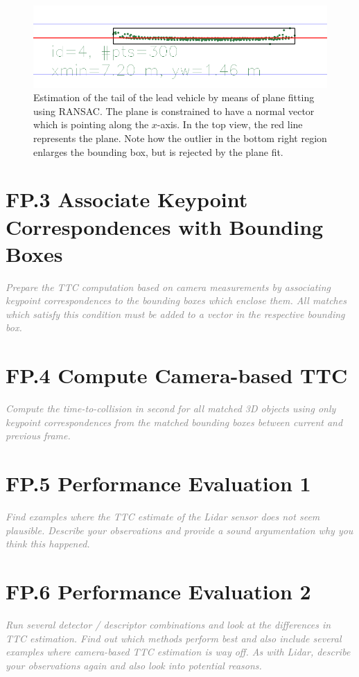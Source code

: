 \documentclass[a4paper]{scrartcl}
\begin{document}
\begin{figure}
	\centering
	\includegraphics[width=0.8\columnwidth]{./img/lidar_ransac_vehicle_tail}
	\caption{Estimation of the tail of the lead vehicle by means of plane
			fitting using RANSAC. The plane is constrained to have
			a normal vector which is pointing along the $x$-axis.
			In the top view, the red line represents the plane.
			Note how the outlier in the bottom right region enlarges
			the bounding box, but is rejected by the plane fit.}
	\label{fig:lidar_ransac}
\end{figure}


\section*{FP.3 Associate Keypoint Correspondences with Bounding Boxes}
\textcolor{gray}{\textit{Prepare the TTC computation based on camera measurements by associating keypoint correspondences to the bounding boxes which enclose them. All matches which satisfy this condition must be added to a vector in the respective bounding box.}}

\section*{FP.4 Compute Camera-based TTC}
\textcolor{gray}{\textit{Compute the time-to-collision in second for all matched 3D objects using only keypoint correspondences from the matched bounding boxes between current and previous frame.}}

\section*{FP.5 Performance Evaluation 1}
\textcolor{gray}{\textit{Find examples where the TTC estimate of the Lidar sensor does not seem plausible. Describe your observations and provide a sound argumentation why you think this happened.}}

\section*{FP.6 Performance Evaluation 2}
\textcolor{gray}{\textit{Run several detector / descriptor combinations and look at the differences in TTC estimation. Find out which methods perform best and also include several examples where camera-based TTC estimation is way off. As with Lidar, describe your observations again and also look into potential reasons.}}
\end{document}
